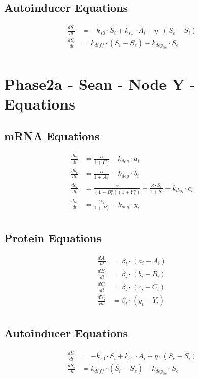 \documentclass[fleqn]{article} %
\begin{document}
\subsection*{Autoinducer Equations}
\begin{align*}
\frac{dS_i}{dt} &= -k_{s0} \cdot S_i + k_{s1} \cdot A_i + \eta \cdot (S_e - S_i) \\
\frac{dS_e}{dt} &= k_{diff} \cdot (\overline{S_i} - S_e) - k_{deg_{Se}} \cdot S_e \\
\end{align*}

\pagebreak

\section*{Phase2a - Sean - Node Y - Equations}

\subsection*{mRNA Equations}
\begin{align*}
\frac{da_i}{dt} &= \frac{\alpha}{1 + C_i^n} - k_{deg} \cdot a_i \\
\frac{db_i}{dt} &= \frac{\alpha}{1 + A_i^n} - k_{deg} \cdot b_i \\
\frac{dc_i}{dt} &= \frac{\alpha}{(1 + B_i^n)(1 + Y_i^n)} + \frac{\kappa \cdot S_i}{1 + S_i} - k_{deg} \cdot c_i \\
\frac{dy_i}{dt} &= \frac{\alpha_y}{1 + B_i^n} - k_{deg} \cdot y_i \\
\end{align*}

\subsection*{Protein Equations}
\begin{align*}
\frac{dA_i}{dt} &= \beta_i \cdot (a_i - A_i) \\
\frac{dB_i}{dt} &= \beta_i \cdot (b_i - B_i) \\
\frac{dC_i}{dt} &= \beta_i \cdot (c_i - C_i) \\
\frac{dY_i}{dt} &= \beta_i \cdot (y_i - Y_i) \\
\end{align*}

\subsection*{Autoinducer Equations}
\begin{align*}
\frac{dS_i}{dt} &= -k_{s0} \cdot S_i + k_{s1} \cdot A_i + \eta \cdot (S_e - S_i) \\
\frac{dS_e}{dt} &= k_{diff} \cdot (\overline{S_i} - S_e) - k_{deg_{Se}} \cdot S_e \\
\end{align*}
\end{document}
